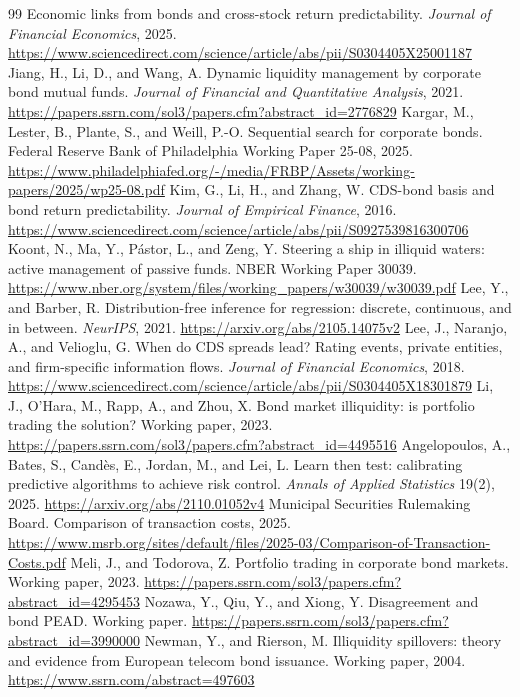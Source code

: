 \documentclass[11pt,letterpaper]{article}
\begin{document}
\begin{thebibliography}{99}
 Economic links from bonds and cross-stock return predictability. \emph{Journal of Financial Economics}, 2025. \url{https://www.sciencedirect.com/science/article/abs/pii/S0304405X25001187}
 Jiang, H., Li, D., and Wang, A. Dynamic liquidity management by corporate bond mutual funds. \emph{Journal of Financial and Quantitative Analysis}, 2021. \url{https://papers.ssrn.com/sol3/papers.cfm?abstract_id=2776829}
 Kargar, M., Lester, B., Plante, S., and Weill, P.-O. Sequential search for corporate bonds. Federal Reserve Bank of Philadelphia Working Paper 25-08, 2025. \url{https://www.philadelphiafed.org/-/media/FRBP/Assets/working-papers/2025/wp25-08.pdf}
 Kim, G., Li, H., and Zhang, W. CDS-bond basis and bond return predictability. \emph{Journal of Empirical Finance}, 2016. \url{https://www.sciencedirect.com/science/article/abs/pii/S0927539816300706}
 Koont, N., Ma, Y., P\'astor, L., and Zeng, Y. Steering a ship in illiquid waters: active management of passive funds. NBER Working Paper 30039. \url{https://www.nber.org/system/files/working_papers/w30039/w30039.pdf}
 Lee, Y., and Barber, R. Distribution-free inference for regression: discrete, continuous, and in between. \emph{NeurIPS}, 2021. \url{https://arxiv.org/abs/2105.14075v2}
 Lee, J., Naranjo, A., and Velioglu, G. When do CDS spreads lead? Rating events, private entities, and firm-specific information flows. \emph{Journal of Financial Economics}, 2018. \url{https://www.sciencedirect.com/science/article/abs/pii/S0304405X18301879}
 Li, J., O'Hara, M., Rapp, A., and Zhou, X. Bond market illiquidity: is portfolio trading the solution? Working paper, 2023. \url{https://papers.ssrn.com/sol3/papers.cfm?abstract_id=4495516}
 Angelopoulos, A., Bates, S., Cand\`es, E., Jordan, M., and Lei, L. Learn then test: calibrating predictive algorithms to achieve risk control. \emph{Annals of Applied Statistics} 19(2), 2025. \url{https://arxiv.org/abs/2110.01052v4}
 Municipal Securities Rulemaking Board. Comparison of transaction costs, 2025. \url{https://www.msrb.org/sites/default/files/2025-03/Comparison-of-Transaction-Costs.pdf}
 Meli, J., and Todorova, Z. Portfolio trading in corporate bond markets. Working paper, 2023. \url{https://papers.ssrn.com/sol3/papers.cfm?abstract_id=4295453}
 Nozawa, Y., Qiu, Y., and Xiong, Y. Disagreement and bond PEAD. Working paper. \url{https://papers.ssrn.com/sol3/papers.cfm?abstract_id=3990000}
 Newman, Y., and Rierson, M. Illiquidity spillovers: theory and evidence from European telecom bond issuance. Working paper, 2004. \url{https://www.ssrn.com/abstract=497603}

\end{thebibliography}
\end{document}
